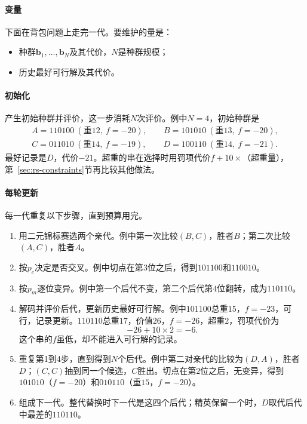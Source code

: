 \paragraph{变量}
下面在背包问题上走完一代。要维护的量是：
\begin{itemize}
 \item 种群$\bm{b}_1,\ldots,\bm{b}_N$及其代价，$N$是种群规模；
 \item 历史最好可行解及其代价。
\end{itemize}

\paragraph{初始化}
产生初始种群并评价，这一步消耗$N$次评价。例中$N=4$，初始种群是
\[
 \begin{gathered}
 A=110100\ (\text{重}12,\ f=-20),\qquad B=101010\ (\text{重}13,\ f=-20),\\
 C=011010\ (\text{重}14,\ f=-19),\qquad D=100110\ (\text{重}14,\ f=-21).
 \end{gathered}
\]
最好记录是$D$，代价$-21$。超重的串在选择时用罚项代价$f+10\times$（超重量），第~\ref{sec:rs-constraints}节再比较其他做法。

\paragraph{每轮更新}
每一代重复以下步骤，直到预算用完。

\begin{enumerate}
 \item 用二元锦标赛选两个亲代。例中第一次比较$(B,C)$，胜者$B$；第二次比较$(A,C)$，胜者$A$。
 \item 按$p_c$决定是否交叉。例中切点在第$3$位之后，得到$101100$和$110010$。
 \item 按$p_m$逐位变异。例中第一个后代不变，第二个后代第$4$位翻转，成为$110110$。
 \item 解码并评价后代，更新历史最好可行解。例中$101100$总重$15$，$f=-23$，可行，记录更新。$110110$总重$17$，价值$26$，$f=-26$，超重$2$，罚项代价为
 \[
  -26+10\times2=-6.
 \]
 这个串的$f$虽低，却不能进入可行解的记录。
 \item 重复第1到4步，直到得到$N$个后代。例中第二对亲代的比较为$(D,A)$，胜者$D$；$(C,C)$抽到同一个候选，$C$胜出。切点在第$2$位之后，无变异，得到$101010$（$f=-20$）和$010110$（重$15$，$f=-20$）。
 \item 组成下一代。整代替换时下一代是这四个后代；精英保留一个时，$D$取代后代中最差的$110110$。
\end{enumerate}

